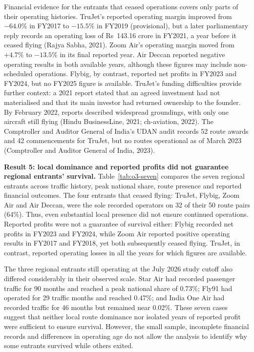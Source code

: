 \documentclass[12pt,a4paper]{article}
\newenvironment{o3box}{\ifthenelse{\boolean{o3highlight}}{\begingroup\color{o3sky}}{}}{\ifthenelse{\boolean{o3highlight}}{\endgroup}{}}
\begin{document}
\begin{o3box}
Financial evidence for the entrants that ceased operations covers only parts of their operating histories. TruJet's reported operating margin improved from $-64.0\%$ in FY2017 to $-15.5\%$ in FY2019 (provisional), but a later parliamentary reply records an operating loss of Rs~143.16 crore in FY2021, a year before it ceased flying (Rajya Sabha, 2021). Zoom Air's operating margin moved from $+4.7\%$ to $-13.5\%$ in its final reported year. Air Deccan reported negative operating results in both available years, although these figures may include non-scheduled operations. Flybig, by contrast, reported net profits in FY2023 and FY2024, but no FY2025 figure is available. TruJet's funding difficulties provide further context: a 2021 report stated that an agreed investment had not materialised and that its main investor had returned ownership to the founder. By February 2022, reports described widespread groundings, with only one aircraft still flying (Hindu BusinessLine, 2021; ch-aviation, 2022). The Comptroller and Auditor General of India's UDAN audit records 52 route awards and 42 commencements for TruJet, but no routes operational as of March 2023 (Comptroller and Auditor General of India, 2023).

\textbf{Result 5: local dominance and reported profits did not guarantee regional entrants' survival.} Table~\ref{tab:o3-seven} compares the seven regional entrants across traffic history, peak national share, route presence and reported financial outcomes. The four entrants that ceased flying: TruJet, Flybig, Zoom Air and Air Deccan, were the sole recorded operators on 32 of their 50 route pairs (64\%). Thus, even substantial local presence did not ensure continued operations. Reported profits were not a guarantee of survival either: Flybig recorded net profits in FY2023 and FY2024, while Zoom Air reported positive operating results in FY2017 and FY2018, yet both subsequently ceased flying. TruJet, in contrast, reported operating losses in all the years for which figures are available.

The three regional entrants still operating at the July 2026 study cutoff also differed considerably in their observed scale. Star Air had recorded passenger traffic for 90 months and reached a peak national share of 0.73\%; Fly91 had operated for 29 traffic months and reached 0.47\%; and India One Air had recorded traffic for 46 months but remained near 0.02\%. These seven cases suggest that neither local route dominance nor isolated years of reported profit were sufficient to ensure survival. However, the small sample, incomplete financial records and differences in operating age do not allow the analysis to identify why some entrants survived while others exited.


\end{o3box}
\end{document}
